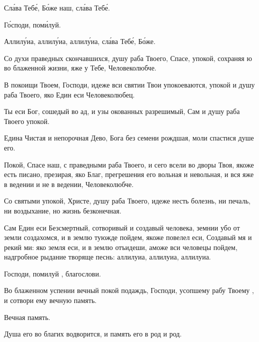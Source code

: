 \begin{mymulticols}


\MolitvamiSviatyhOtecNashih 

Сл\'{а}ва Теб\'{е}, Б\'{о}же наш, сл\'{а}ва Теб\'{е}. 

\TsariuNebesnyj

\TrisviatoePoOtcheNash

Г\'{о}споди, пом\'{и}луй. 

\slavainynen

\priiditepoklonimsia


\PsalmNinety

\slavainyne 

Аллил\'{у}иа, аллил\'{у}иа, аллил\'{у}иа, сл\'{а}ва Теб\'{е}, Б\'{о}же. 


Со духи праведных скончавшихся, душу раба Твоего, Спасе, упокой, сохраняя ю во блаженной жизни, яже у Тебе, Человеколюбче. 

В покоищи Твоем, Господи, идеже вси святии Твои упокоеваются, упокой и душу раба Твоего, яко Един еси Человеколюбец. 

\slavan

Ты еси Бог, сошедый во ад, и узы окованных разрешимый, Сам и душу раба Твоего упокой. 

\inynen

Едина Чистая и непорочная Дево, Бога без семени рождшая, моли спастися душе его.


Покой, Спасе наш, с праведными раба Твоего, и сего всели во дворы Твоя, якоже есть писано, презирая, яко Благ, прегрешения его вольная и невольная, и вся яже в ведении и не в ведении, Человеколюбче. 


Со святыми упокой, Христе, душу раба Твоего, идеже несть болезнь, ни печаль, ни воздыхание, но жизнь безконечная.


Сам Един еси Безсмертный, сотворивый и создавый человека, земнии убо от земли создахомся, и в землю туюжде пойдем, якоже повелел еси, Создавый мя и рекий ми: яко земля еси, и в землю отъидеши, аможе вси человецы пойдем, надгробное рыдание творяще песнь: аллилуиа, аллилуиа, аллилуиа. 

\Chestneyshuyu 

\slavainyne 

Господи, помилуй , благослови. 

\MolitvamiSviatyhOtecNashih

Во блаженном успении вечный покой подаждь, Господи, усопшему рабу Твоему , и сотвори ему вечную память. 

Вечная память. 

Душа его во благих водворится, и память его в род и род. 

\end{mymulticols}

